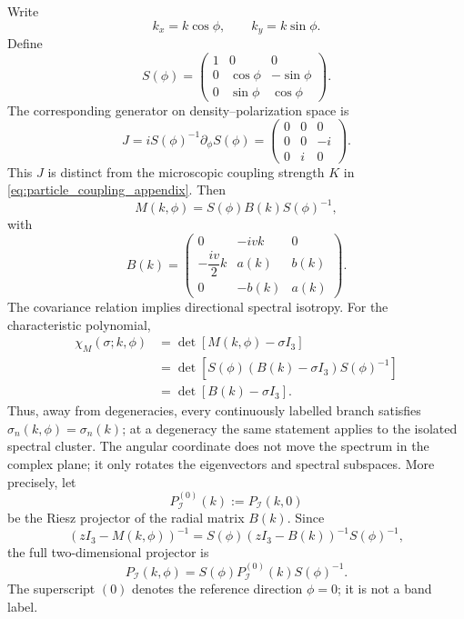 \documentclass[11pt]{article}
\numberwithin{equation}{section}
\begin{document}
Write
\begin{equation}
  k_x=k\cos\phi,\qquad k_y=k\sin\phi.
\end{equation}
Define
\begin{equation}
  S(\phi)=
  \begin{pmatrix}
  1&0&0\\
  0&\cos\phi&-\sin\phi\\
  0&\sin\phi&\cos\phi
  \end{pmatrix}.
\end{equation}
The corresponding generator on density--polarization space is
\begin{equation}
  J=iS(\phi)^{-1}\partial_\phi S(\phi)=
  \begin{pmatrix}
  0&0&0\\
  0&0&-i\\
  0&i&0
  \end{pmatrix}.
  \label{eq:angular_generator}
\end{equation}
This $J$ is distinct from the microscopic coupling strength $K$ in
\eqref{eq:particle_coupling_appendix}.
Then
\begin{equation}
  M(k,\phi)=S(\phi)B(k)S(\phi)^{-1},
  \label{eq:rotational_covariance}
\end{equation}
with
\begin{equation}
  B(k)=
  \begin{pmatrix}
  0&-ivk&0\\[4pt]
  -\dfrac{iv}{2}k&a(k)&b(k)\\[4pt]
  0&-b(k)&a(k)
  \end{pmatrix}.
  \label{eq:radial_matrix}
\end{equation}
The covariance relation implies directional spectral isotropy. For the
characteristic polynomial,
\begin{align}
  \chi_M(\sigma;k,\phi)
  &=
  \det[M(k,\phi)-\sigma I_3]\nonumber\\
  &=
  \det[S(\phi)(B(k)-\sigma I_3)S(\phi)^{-1}]\nonumber\\
  &=
  \det[B(k)-\sigma I_3].
  \label{eq:direction_independent_characteristic}
\end{align}
Thus, away from degeneracies, every continuously labelled branch satisfies
$\sigma_n(k,\phi)=\sigma_n(k)$; at a degeneracy the same statement applies
to the isolated spectral cluster. The angular coordinate does not move the
spectrum in the complex plane; it only rotates the eigenvectors and spectral
subspaces. More precisely, let
\begin{equation}
  P_{\mathcal I}^{(0)}(k):=P_{\mathcal I}(k,0)
\end{equation}
be the Riesz projector of the radial matrix $B(k)$. Since
\begin{equation}
  (zI_3-M(k,\phi))^{-1}
  =S(\phi)(zI_3-B(k))^{-1}S(\phi)^{-1},
\end{equation}
the full two-dimensional projector is
\begin{equation}
  P_{\mathcal I}(k,\phi)=
  S(\phi)P_{\mathcal I}^{(0)}(k)S(\phi)^{-1}.
  \label{eq:projector_rotational_covariance}
\end{equation}
The superscript $(0)$ denotes the reference direction $\phi=0$; it is not
a band label.
\end{document}
